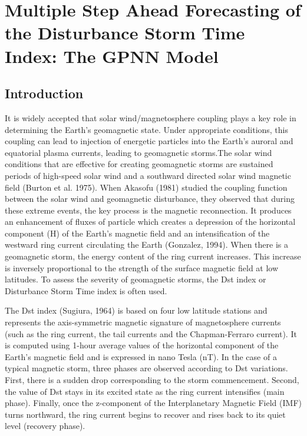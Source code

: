 \chapter{Multiple Step Ahead Forecasting of the Disturbance Storm Time Index: The GPNN Model}\label{chapter:dst_msa}

\section{Introduction}

It is widely accepted that solar wind/magnetosphere coupling plays a key role in determining the Earth’s 
geomagnetic state. Under appropriate conditions, this coupling can lead to injection of energetic particles 
into the Earth’s auroral and equatorial plasma currents, leading to geomagnetic storms.The solar wind conditions 
that are effective for creating geomagnetic storms are sustained periods of high-speed solar wind and a southward 
directed solar wind magnetic field (Burton et al. 1975). When Akasofu (1981) studied the coupling function 
between the solar wind and geomagnetic disturbance, they observed that during these extreme events, the key process 
is the magnetic reconnection. It produces an enhancement of fluxes of particle which creates a depression of the 
horizontal component (H) of the Earth’s magnetic field and an intensification of the westward ring current 
circulating the Earth (Gonzalez, 1994). When there is a geomagnetic storm, the energy content of the ring current 
increases. This increase is inversely proportional to the strength of the surface magnetic field at low latitudes. 
To assess the severity of geomagnetic storms, the Dst index or Disturbance Storm Time index is often used. 

The Dst index (Sugiura, 1964) is based on four low latitude stations and represents the axis-symmetric 
magnetic signature of magnetosphere currents (such as the ring current, the tail currents and the 
Chapman-Ferraro current). It is computed using 1-hour average values of the horizontal component of the 
Earth’s magnetic field and is expressed in nano Tesla (nT). In the case of a typical magnetic storm, 
three phases are observed according to Dst variations. First, there is a sudden drop corresponding to 
the storm commencement. Second, the value of Dst stays in its excited state as the ring current intensifies (main phase). Finally, once the z-component of the Interplanetary Magnetic Field (IMF) turns northward, the ring current begins to recover and rises back to its quiet level (recovery phase). 

